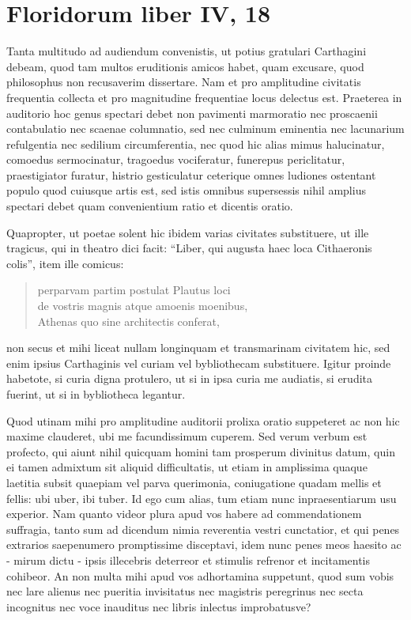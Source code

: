 
\section*{Floridorum liber IV, 18}
	
Tanta multitudo ad audiendum convenistis, ut potius gratulari Carthagini debeam, quod tam multos eruditionis amicos habet, quam excusare, quod philosophus non recusaverim dissertare. Nam et pro amplitudine civitatis frequentia collecta et pro magnitudine frequentiae locus delectus est. Praeterea in auditorio hoc genus spectari debet non pavimenti marmoratio nec proscaenii contabulatio nec scaenae columnatio, sed nec culminum eminentia nec lacunarium refulgentia nec sedilium circumferentia, nec quod hic alias mimus halucinatur, comoedus sermocinatur, tragoedus vociferatur, funerepus periclitatur, praestigiator furatur, histrio gesticulatur ceterique omnes ludiones ostentant populo quod cuiusque artis est, sed istis omnibus supersessis nihil amplius spectari debet quam convenientium ratio et dicentis oratio. 

Quapropter, ut poetae solent hic ibidem varias civitates substituere, ut ille tragicus, qui in theatro dici facit: ``Liber, qui augusta haec loca Cithaeronis colis'', item ille comicus:
\begin{verse}
perparvam partim postulat Plautus loci \\
de vostris magnis atque amoenis moenibus, \\
Athenas quo sine architectis conferat,
\end{verse}
non secus et mihi liceat nullam longinquam et transmarinam civitatem hic, sed enim ipsius Carthaginis vel curiam vel bybliothecam substituere. Igitur proinde habetote, si curia digna protulero, ut si in ipsa curia me audiatis, si erudita fuerint, ut si in bybliotheca legantur. 

Quod utinam mihi pro amplitudine auditorii prolixa oratio suppeteret ac non hic maxime clauderet, ubi me facundissimum cuperem. Sed verum verbum est profecto, qui aiunt nihil quicquam homini tam prosperum divinitus datum, quin ei tamen admixtum sit aliquid difficultatis, ut etiam in amplissima quaque laetitia subsit quaepiam vel parva querimonia, coniugatione quadam mellis et fellis: ubi uber, ibi tuber. Id ego cum alias, tum etiam nunc inpraesentiarum usu experior. Nam quanto videor plura apud vos habere ad commendationem suffragia, tanto sum ad dicendum nimia reverentia vestri cunctatior, et qui penes extrarios saepenumero promptissime disceptavi, idem nunc penes meos haesito ac - mirum dictu - ipsis illecebris deterreor et stimulis refrenor et incitamentis cohibeor. An non multa mihi apud vos adhortamina suppetunt, quod sum vobis nec lare alienus nec pueritia invisitatus nec magistris peregrinus nec secta incognitus nec voce inauditus nec libris inlectus improbatusve? 

